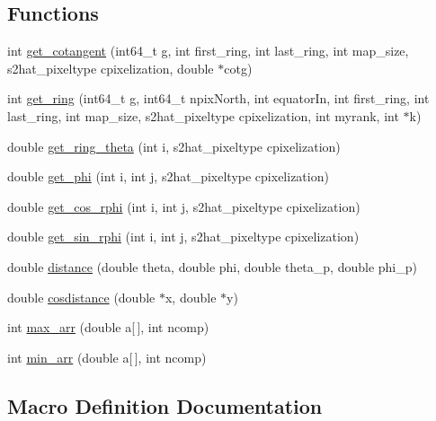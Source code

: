 \subsection*{Functions}
\begin{DoxyCompactItemize}
\item 
int \hyperlink{derivatives__nersc_2lensing__sub_8c_adfd4526ab7b84ab4063eafa3aff125f5}{get\-\_\-cotangent} (int64\-\_\-t g, int first\-\_\-ring, int last\-\_\-ring, int map\-\_\-size, s2hat\-\_\-pixeltype cpixelization, double $\ast$cotg)
\item 
int \hyperlink{derivatives__nersc_2lensing__sub_8c_a515ce6e32c83cc252ce2d98da4b8f6d0}{get\-\_\-ring} (int64\-\_\-t g, int64\-\_\-t npix\-North, int equator\-In, int first\-\_\-ring, int last\-\_\-ring, int map\-\_\-size, s2hat\-\_\-pixeltype cpixelization, int myrank, int $\ast$k)
\item 
double \hyperlink{derivatives__nersc_2lensing__sub_8c_a01cfb565f05ca0574ffe427957766e22}{get\-\_\-ring\-\_\-theta} (int i, s2hat\-\_\-pixeltype cpixelization)
\item 
double \hyperlink{derivatives__nersc_2lensing__sub_8c_a8b0d92bd46d564b7cb02a352506cd8d1}{get\-\_\-phi} (int i, int j, s2hat\-\_\-pixeltype cpixelization)
\item 
double \hyperlink{derivatives__nersc_2lensing__sub_8c_ade4546fa40d7a7fb7f0e9e8e7ac745df}{get\-\_\-cos\-\_\-rphi} (int i, int j, s2hat\-\_\-pixeltype cpixelization)
\item 
double \hyperlink{derivatives__nersc_2lensing__sub_8c_aacc42f0ba3fce9b9951cd6dba4d60ebf}{get\-\_\-sin\-\_\-rphi} (int i, int j, s2hat\-\_\-pixeltype cpixelization)
\item 
double \hyperlink{derivatives__nersc_2lensing__sub_8c_a8dbb3ac3e6c8aa872d542c9789239708}{distance} (double theta, double phi, double theta\-\_\-p, double phi\-\_\-p)
\item 
double \hyperlink{derivatives__nersc_2lensing__sub_8c_a356fc5cd79e083685c111f791709e85b}{cosdistance} (double $\ast$x, double $\ast$y)
\item 
int \hyperlink{derivatives__nersc_2lensing__sub_8c_a19e2918b377bd820f3a20dee06b88de2}{max\-\_\-arr} (double a\mbox{[}$\,$\mbox{]}, int ncomp)
\item 
int \hyperlink{derivatives__nersc_2lensing__sub_8c_a3f0449ae9cbd5c0005db6d26da882085}{min\-\_\-arr} (double a\mbox{[}$\,$\mbox{]}, int ncomp)
\end{DoxyCompactItemize}


\subsection{Macro Definition Documentation}
